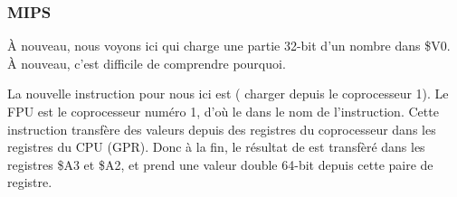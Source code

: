 \subsubsection{MIPS}



À nouveau, nous voyons ici  qui charge une partie 32-bit d'un nombre \Tdouble
dans \$V0.
À nouveau, c'est difficile de comprendre pourquoi.


La nouvelle instruction pour nous ici est  (
charger depuis le coprocesseur 1).
Le FPU est le coprocesseur numéro 1, d'où le  dans le nom de l'instruction.
Cette instruction transfère des valeurs depuis des registres du coprocesseur dans
les registres du CPU (\ac{GPR}).
Donc à la fin, le résultat de  est transfèré dans les registres \$A3 et
\$A2, et \printf prend une valeur double 64-bit depuis cette paire de registre.

